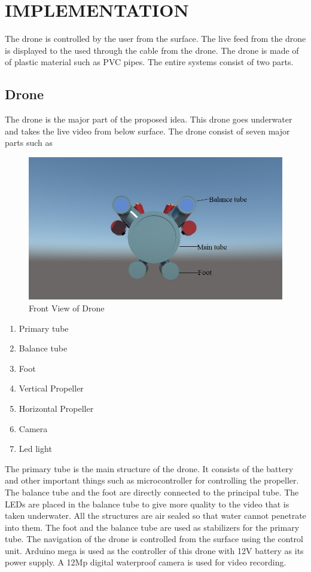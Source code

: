 \chapter{IMPLEMENTATION}\thispagestyle{EmptyHeader}
\label{chp:2}
The drone is controlled by the user from the surface. The live feed from the drone is displayed to the used through the cable from the drone. The drone is made of of plastic material such as PVC pipes. The entire systems consist of two parts.

\section{Drone}

The drone is the major part of the proposed idea. This drone goes underwater and takes the live video from below surface. The drone consist of seven major parts such as

\begin{figure}[ht]
	\centering
	\includegraphics[width=\linewidth]{images/FrontView.jpg}
	\caption{Front View of Drone}
	\label{diag:sample}
\end{figure}

\begin{enumerate}
    \item Primary tube
    \item Balance tube
    \item Foot
    \item Vertical Propeller
    \item Horizontal Propeller
    \item Camera
    \item Led light
\end{enumerate}


The primary tube is the main structure of the drone. It consists of the battery and other important things such as microcontroller for controlling the propeller. The balance tube and the foot are directly connected to the principal tube. The LEDs are placed in the balance tube to give more quality to the video that is taken underwater. All the structures are air sealed so that water cannot penetrate into them. The foot and the balance tube are used as stabilizers for the primary tube. The navigation of the drone is controlled from the surface using the control unit. Arduino mega is used as the controller of this drone with 12V battery as its power supply. A 12Mp digital waterproof camera is used for video recording. 


